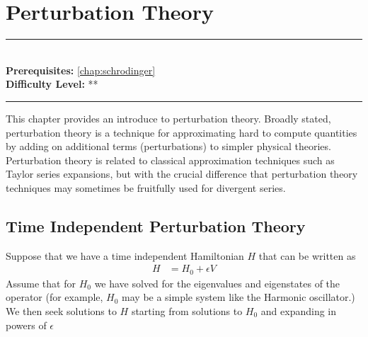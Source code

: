 \documentclass[book.tex]{subfiles}
\begin{document}
\chapter{Perturbation Theory}

\label{chap:perturbation_theory}
\noindent\rule{11cm}{0.4pt} \\
\textbf{Prerequisites:} \autoref{chap:schrodinger} \\
\textbf{Difficulty Level:} ** \\
\noindent\rule{11cm}{0.4pt}
\vspace{5mm}

This chapter provides an introduce to perturbation theory. Broadly stated, perturbation theory is a technique for approximating hard to compute quantities by adding on additional terms (perturbations) to simpler physical theories. Perturbation theory is related to classical approximation techniques such as Taylor series expansions, but with the crucial difference that perturbation theory techniques may sometimes be fruitfully used for divergent series.

\section{Time Independent Perturbation Theory}

Suppose that we have a time independent Hamiltonian $H$ that can be written as
\begin{align}
    H &= H_0 + \epsilon V
\end{align}
Assume that for $H_0$ we have solved for the eigenvalues and eigenstates of the operator (for example, $H_0$ may be a simple system like the Harmonic oscillator.) We then seek solutions to $H$ starting from solutions to $H_0$ and expanding in powers of $\epsilon$

\end{document}
